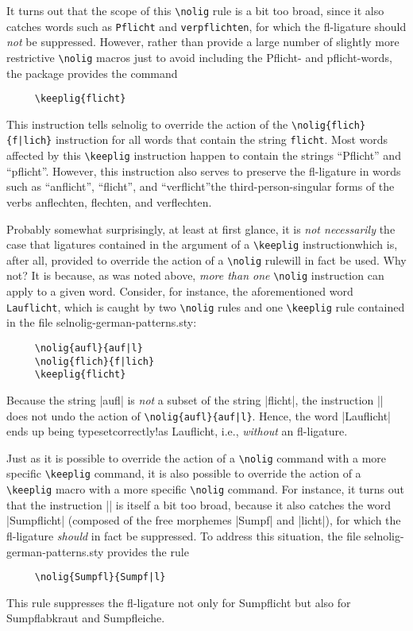\documentclass[11pt]{article}
\newcommand{\pkg}[1]{\textsf{#1}}
\newcommand{\opt}[1]{\texttt{#1}}
\newcommand{\cmmd}[1]{\texttt{\textbackslash #1}}
\begin{document}
It turns out that the scope of this \cmmd{nolig} rule is a bit too broad, since it also catches words such as \opt{Pflicht} and \opt{verpflichten}, for which the fl-ligature should \emph{not} be suppressed. However, rather than provide a large number of slightly more restrictive \cmmd{nolig} macros just to avoid including the Pflicht- and pflicht-words, the package provides the command
\begin{Verbatim}
     \keeplig{flicht}
\end{Verbatim}
This instruction tells \pkg{selnolig} to override the action of the \Verb+\nolig{flich}{f|lich}+ instruction for all words that contain the string \opt{flicht}. Most words affected by this \cmmd{keeplig} instruction happen to contain the strings \enquote{Pflicht} and \enquote{pflicht}. However, this instruction also serves to preserve the fl-ligature in words such as \enquote{anflicht}, \enquote{flicht}, and \enquote{verflicht}\textemdash the third-person-singular forms of the verbs anflechten, flechten, and verflechten. 

Probably somewhat surprisingly, at least at first glance, it is \emph{not necessarily} the case that ligatures contained in the argument of a \cmmd{keeplig} instruction\textemdash which is, after all, provided to override the action of a \cmmd{nolig} rule\textemdash will in fact be used. Why not? It is because, as was noted above, \emph{more than one} \cmmd{nolig} instruction can apply to a given word. Consider, for instance, the aforementioned word \opt{Lauflicht}, which is caught by two \cmmd{nolig} rules and one \cmmd{keeplig} rule contained in the file \pkg{selnolig-german-patterns.sty}:
\begin{Verbatim}
     \nolig{aufl}{auf|l}
     \nolig{flich}{f|lich}
     \keeplig{flicht}
\end{Verbatim}
Because the string |aufl| is \emph{not} a subset of the string |flicht|, the instruction || does not undo the action of \Verb+\nolig{aufl}{auf|l}+. Hence, the word |Lauflicht| ends up being typeset\textemdash correctly!\textemdash as Lauflicht, i.e., \emph{without} an fl-ligature. 

Just as it is possible to override the action of a \cmmd{nolig} command with a more specific \cmmd{keeplig} command, it is also possible to override the action of a \cmmd{keeplig} macro with a more specific \cmmd{nolig} command. For instance, it turns out that the instruction || is itself a bit too broad, because it also catches the word |Sumpflicht| (composed of the free morphemes |Sumpf| and |licht|), for which the fl-ligature \emph{should} in fact be suppressed. To address this situation, the file \pkg{selnolig-german-patterns.sty} provides the rule 
\begin{Verbatim}
     \nolig{Sumpfl}{Sumpf|l}
\end{Verbatim}
This rule suppresses the fl-ligature not only for Sumpflicht but also for Sumpflabkraut and Sumpfleiche.
\end{document}
